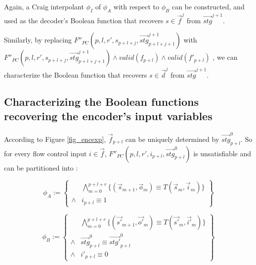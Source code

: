 \documentclass[conference]{IEEEtran}
\begin{document}
Again,
a Craig interpolant $\phi_I$ of $\phi_A$ with respect to $\phi_B$ can be constructed,
and used as the decoder's Boolean function that recovers $s\in\vec{f}^{j}$ from $\vec{stg}^{j+1}$.

Similarly,
by replacing $F''_{PC}(p,l,r',s_{p+l+j},\vec{stg}^{j+1}_{p+l+j+1})$  with 
$F''_{PC}(p,l,r',s_{p+l+j},\vec{stg}^{j+1}_{p+l+j+1})\wedge valid(f_{p+l})\wedge valid(f'_{p+l})$ ,
we can characterize the Boolean function that recovers $s\in\vec{d}^{j}$ from $\vec{stg}^{j+1}$.

\subsection{Characterizing the Boolean functions recovering the encoder's input variables}

According to Figure \ref{fig_encexp},
$\vec{f}_{p+l}$ can be uniquely determined by $\vec{stg}^0_{p+l}$.
So for every flow control input $i\in\vec{f}$,
$F''_{PC}(p,l,r',i_{p+l},\vec{stg}^0_{p+l})$ is unsatisfiable and can be partitioned into :

\begin{equation}
\phi_A:=
\left\{
\begin{array}{cc}
&\bigwedge_{m=0}^{p+l+r}
\{
(\vec{s}_{m+1},\vec{o}_m)\equiv T(\vec{s}_m,\vec{i}_m)
\}
\\
\wedge& i_{p+l}\equiv 1 
\end{array}
\right\}
\end{equation}

\begin{equation}
\phi_B:=
\left\{
\begin{array}{cc}
&\bigwedge_{m=0}^{p+l+r}
\{
(\vec{s'}_{m+1},\vec{o'}_m)\equiv T(\vec{s'}_m,\vec{i'}_m)
\}
\\
\wedge&\vec{stg}^0_{p+l}\equiv \vec{stg'}^0_{p+l} \\
\wedge& i'_{p+l}\equiv 0 
\end{array}
\right\}
\end{equation}
\end{document}
